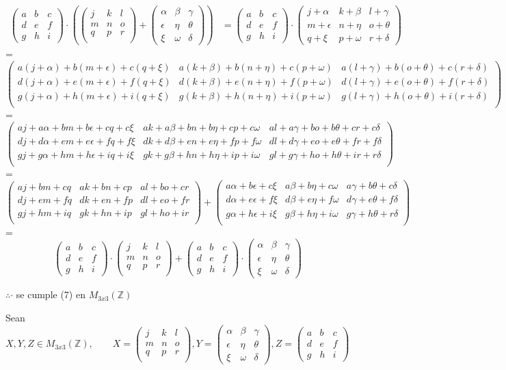 \documentclass[letterpaper]{article}
\newcommand{\Nmat}{\begin{pmatrix}
		j & k & l\\
		m & n & o\\
		q & p & r\\
\end{pmatrix}}
\newcommand{\Pmat}{\begin{pmatrix}
		\alpha & \beta & \gamma\\
		\epsilon & \eta & \theta\\
		\xi & \omega & \delta
\end{pmatrix}}
\newcommand{\Mmat}{\begin{pmatrix}
		a & b & c\\
		d & e & f\\
		g & h & i
\end{pmatrix}}
\newcommand{\mtt}{M_{3x3}(\mathds{Z})}
\renewcommand{\*}{\cdot}
\theoremstyle{definition}
\begin{document}
\begin{align*}
\Mmat \* \left( \Nmat + \Pmat \right) &= \Mmat \* \begin{pmatrix}
j + \alpha & k + \beta & l + \gamma\\
m + \epsilon & n + \eta & o + \theta\\
q + \xi & p + \omega & r + \delta
\end{pmatrix} \
\end{align*} 
\centering =
$$
\begin{pmatrix}
a(j + \alpha) + b(m + \epsilon) + c(q + \xi) & a(k + \beta) + b(n + \eta) + c(p + \omega) & a(l + \gamma) + b(o + \theta) + c(r + \delta)\\
d(j + \alpha) + e(m + \epsilon) + f(q + \xi) & d(k + \beta) + e(n + \eta) + f(p + \omega) & d(l + \gamma) + e(o + \theta) + f(r + \delta)\\
g(j + \alpha) + h(m + \epsilon) + i(q + \xi) & g(k + \beta) + h(n + \eta) + i(p + \omega) & g(l + \gamma) + h(o + \theta) + i(r + \delta)\\
\end{pmatrix}
$$
\centering =
$$ 
\begin{pmatrix}
aj + a\alpha + bm + b\epsilon + cq + c\xi & ak + a\beta + bn + b\eta + cp + c\omega & al + a\gamma + bo + b\theta + cr + c\delta\\
dj + d\alpha + em + e\epsilon + fq + f\xi & dk + d\beta + en + e\eta + fp + f\omega & dl + d\gamma + eo + e\theta + fr + f\delta\\
gj + g\alpha + hm + h\epsilon + iq + i\xi & gk + g\beta + hn + h\eta + ip + i\omega & gl + g\gamma + ho + h\theta + ir + r\delta\\
\end{pmatrix}
$$ \centering =
$$
\begin{pmatrix}
aj + bm + cq  & ak + bn + cp  & al + bo + cr \\
dj + em + fq  & dk + en + fp  & dl + eo + fr \\
gj + hm + iq  & gk + hn + ip  & gl + ho + ir \\
\end{pmatrix}
+
\begin{pmatrix}
a\alpha + b\epsilon + c\xi & a\beta + b\eta + c\omega & a\gamma + b\theta + c\delta\\
d\alpha + e\epsilon + f\xi & d\beta + e\eta + f\omega & d\gamma + e\theta + f\delta\\
g\alpha + h\epsilon + i\xi & g\beta + h\eta + i\omega & g\gamma + h\theta + r\delta\\
\end{pmatrix}
$$
\centering =
$$
\Mmat \* \Nmat + \Mmat \* \Pmat 
$$
\begin{center}
	$ \therefore \*$ se cumple (7) en $ \mtt $
\end{center}
\newpage
Sean $ X, Y, Z \in  \mtt, \qquad X = \Nmat, Y = \Pmat, Z = \Mmat $\\
\end{document}
